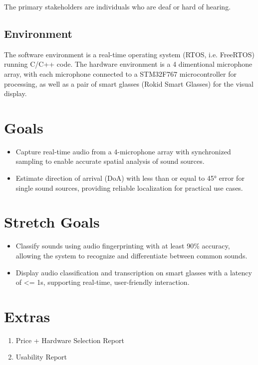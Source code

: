 \documentclass{article}
\begin{document}
The primary stakeholders are individuals who are deaf or hard of hearing.

\subsection{Environment}

The software environment is a real-time operating system (RTOS, i.e. FreeRTOS)
running C/C++ code. The hardware environment is a 4 dimentional microphone
array, with each microphone connected to a STM32F767 microcontroller for
processing, as well as a pair of smart glasses (Rokid Smart Glasses) for the
visual display.

\section{Goals}

\begin{itemize}
    \item Capture real-time audio from a 4-microphone array with synchronized
    sampling to enable accurate spatial analysis of sound sources.
    \item Estimate direction of arrival (DoA) with less than or equal to 45°
    error for single sound sources, providing reliable localization for practical use cases.
\end{itemize}
\section{Stretch Goals}

\begin{itemize}
    \item Classify sounds using audio fingerprinting with at least 90\% accuracy,
    allowing the system to recognize and differentiate between common sounds.
    \item Display audio classification and transcription on smart glasses with a latency of <= 1s,
    supporting real-time, user-friendly interaction.
\end{itemize}
\section{Extras}

\begin{enumerate}
    \item Price + Hardware Selection Report
    \item Usability Report
\end{enumerate} 
\end{document}

